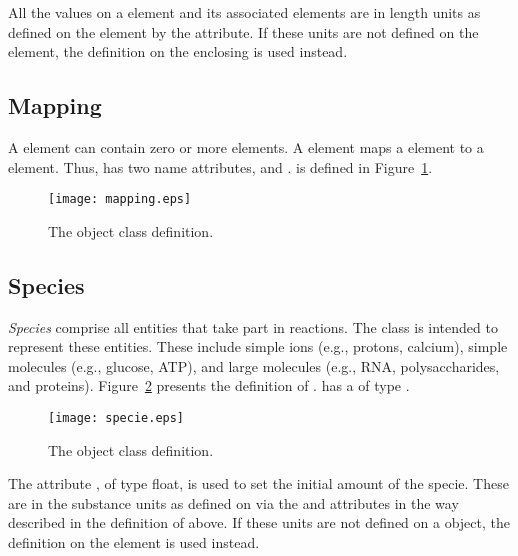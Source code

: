 \documentclass[10pt]{cek-article}
\begin{document}
All the values on a  element and its associated elements
are in length units as defined on the  element by the
 attribute.  If these units are not defined on the
 element, the definition on the enclosing  is
used instead.

\subsection{Mapping}

A  element can contain zero or more  elements.
A  element maps a  element to a
 element.  Thus,  has two name attributes,
 and .   is defined in
Figure~\ref{fig:mapping}.

\begin{figure}[htb]
  \centering
  \texttt{[image: mapping.eps]}
  \caption{The  object class definition.}
  \label{fig:mapping}
\end{figure}


\subsection{Species}
\label{sub:species}

\emph{Species} comprise all entities that take part in reactions.  The
 class is intended to represent these entities.  These
include simple ions (e.g., protons, calcium), simple molecules (e.g.,
glucose, ATP), and large molecules (e.g., RNA, polysaccharides, and
proteins).  Figure~\ref{fig:specie} presents the definition of
.   has a  of type .

\begin{figure}[htb]
  \centering
  \texttt{[image: specie.eps]}
  \caption{The  object class definition.}
  \label{fig:specie}
\end{figure}

The attribute , of type float, is used to set the
initial amount of the specie.  These are in the substance units as defined
on  via the  and
 attributes in the way described in
the definition of  above.  If these units are not defined on a
 object, the definition on the  element is used
instead.
\end{document}
